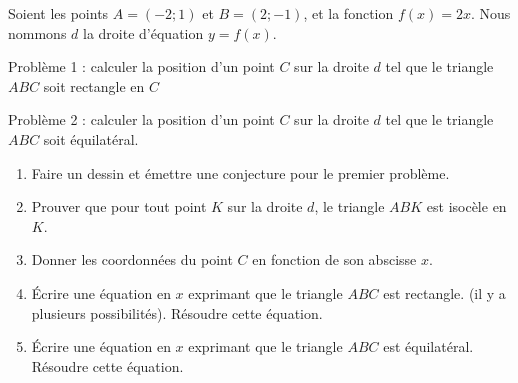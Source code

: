 
\begin{exercice}\label{exosmath-0077}

    Soient les points \( A=(-2;1)\) et \( B=(2;-1)\), et la fonction \( f(x)=2x\). Nous nommons \( d\) la droite d'équation \( y=f(x)\).

    Problème 1 : calculer la position d'un point \( C\) sur la droite \( d\) tel que le triangle \( ABC\) soit rectangle en \( C\)

    Problème 2 : calculer la position d'un point \( C\) sur la droite \( d\) tel que le triangle \( ABC\) soit équilatéral.

    \begin{enumerate}
        \item
            Faire un dessin et émettre une conjecture pour le premier problème.
        \item
            Prouver que pour tout point \( K\) sur la droite \( d\), le triangle \( ABK\) est isocèle en \( K\).
        \item
            Donner les coordonnées du point \( C\) en fonction de son abscisse \( x\).
        \item
            Écrire une équation en \( x\) exprimant que le triangle \( ABC\) est rectangle. (il y a plusieurs possibilités). Résoudre cette équation.
        \item
            Écrire une équation en \( x\) exprimant que le triangle \( ABC\) est équilatéral. Résoudre cette équation.
    \end{enumerate}

\end{exercice}
